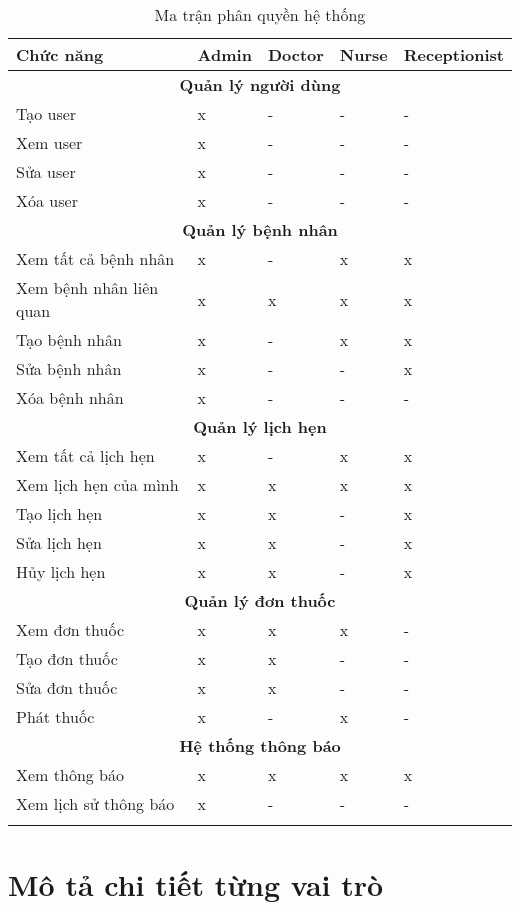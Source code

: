 \documentclass[12pt,a4paper]{report}
\begin{document}
\begin{longtable}{|p{3cm}|p{2cm}|p{2cm}|p{2cm}|p{2cm}|}
\hline
\textbf{Chức năng} & \textbf{Admin} & \textbf{Doctor} & \textbf{Nurse} & \textbf{Receptionist} \\
\hline
\multicolumn{5}{|c|}{\textbf{Quản lý người dùng}} \\
\hline
Tạo user & x & - & - & - \\
\hline
Xem user & x & - & - & - \\
\hline
Sửa user & x & - & - & - \\
\hline
Xóa user & x & - & - & - \\
\hline
\multicolumn{5}{|c|}{\textbf{Quản lý bệnh nhân}} \\
\hline
Xem tất cả bệnh nhân & x & - & x & x \\
\hline
Xem bệnh nhân liên quan & x & x & x & x \\
\hline
Tạo bệnh nhân & x & - & x & x \\
\hline
Sửa bệnh nhân & x & - & - & x \\
\hline
Xóa bệnh nhân & x & - & - & - \\
\hline
\multicolumn{5}{|c|}{\textbf{Quản lý lịch hẹn}} \\
\hline
Xem tất cả lịch hẹn & x & - & x & x \\
\hline
Xem lịch hẹn của mình & x & x & x & x \\
\hline
Tạo lịch hẹn & x & x & - & x \\
\hline
Sửa lịch hẹn & x & x & - & x \\
\hline
Hủy lịch hẹn & x & x & - & x \\
\hline
\multicolumn{5}{|c|}{\textbf{Quản lý đơn thuốc}} \\
\hline
Xem đơn thuốc & x & x & x & - \\
\hline
Tạo đơn thuốc & x & x & - & - \\
\hline
Sửa đơn thuốc & x & x & - & - \\
\hline
Phát thuốc & x & - & x & - \\
\hline
\multicolumn{5}{|c|}{\textbf{Hệ thống thông báo}} \\
\hline
Xem thông báo & x & x & x & x \\
\hline
Xem lịch sử thông báo & x & - & - & - \\
\hline
\caption{Ma trận phân quyền hệ thống}
\end{longtable}

\section{Mô tả chi tiết từng vai trò}
\end{document}

